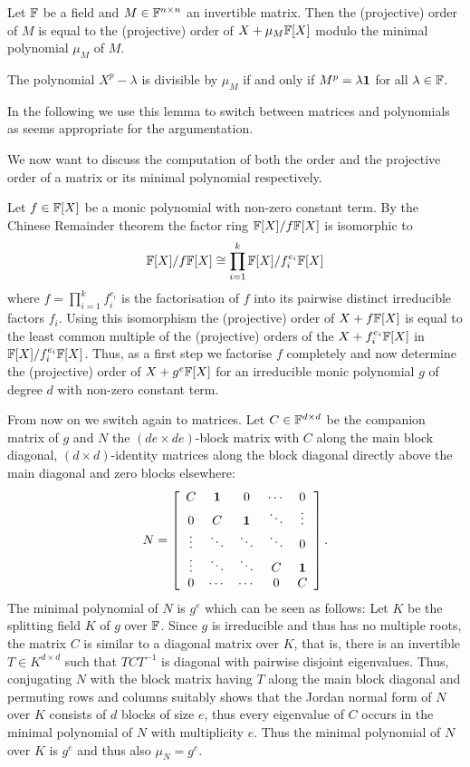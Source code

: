 \begin{Lemm}
Let $\mathbb{F}$ be a field and $M \in \mathbb{F}^{n \times n}$ an invertible matrix.
Then the (projective) order of $M$ is equal to the (projective) order of
$X + \mu_M \mathbb{F}[X]$ modulo the minimal polynomial $\mu_M$ of $M$.
\end{Lemm}
\proofbeg 
The polynomial $X^p-\lambda$ is divisible by $\mu_M$ if and
only if $M^p = \lambda \mathbf{1}$ for all $\lambda \in \mathbb{F}$.
\proofend

In the following we use this lemma to switch between matrices and
polynomials as seems appropriate for the argumentation.

We now want to discuss the computation of both the order and the
projective order of a matrix or its minimal polynomial respectively.

Let $f \in \mathbb{F}[X]$ be a monic polynomial with non-zero constant term. 
By the Chinese Remainder theorem the factor ring
$\mathbb{F}[X]/f\mathbb{F}[X]$ is isomorphic to
\[ \mathbb{F}[X]/f\mathbb{F}[X] \cong
   \prod_{i=1}^k \mathbb{F}[X]/f_i^{e_i} \mathbb{F}[X] \]
where $f = \prod_{i=1}^k f_i^{e_i}$ is the factorisation of $f$ into
its pairwise distinct irreducible factors $f_i$. Using this
isomorphism the (projective) order of $X+f\mathbb{F}[X]$ is equal to the least 
common multiple of the (projective) orders of the $X + f_i^{e_i}
\mathbb{F}[X]$ in $\mathbb{F}[X]/f_i^{e_i}\mathbb{F}[X]$. Thus, as a first step we factorise
$f$ completely and now determine the (projective) order of
$X+g^e\mathbb{F}[X]$ for an irreducible monic polynomial $g$ of degree $d$ 
with non-zero constant term.

From now on we switch again to matrices. Let $C \in \mathbb{F}^{d \times d}$ be 
the companion matrix of $g$ and $N$ the $(de \times de)$-block matrix with 
$C$ along the main block diagonal, $(d \times d)$-identity matrices
along the block diagonal directly above the main diagonal and zero blocks
elsewhere:
\[ N = \left[ \begin{array}{ccccc}
    C      & \mathbf{1}   & 0      & \cdots & 0 \\
    0      & C      & \mathbf{1}   & \ddots & \vdots \\
    \vdots & \ddots & \ddots & \ddots & 0 \\
    \vdots & \ddots & \ddots & C      & \mathbf{1} \\
    0      & \cdots & \cdots & 0      & C
\end{array} \right]. \]
The minimal polynomial of $N$ is $g^e$ which can be seen as follows:
Let $K$ be the splitting field $K$ of $g$ over $\mathbb{F}$. Since $g$ is
irreducible and thus has no multiple roots, the 
matrix $C$ is similar to a diagonal matrix over $K$, that is, there is an
invertible $T \in K^{d \times d}$ such that $TCT^{-1}$ is diagonal
with pairwise disjoint eigenvalues.
Thus, conjugating $N$ with the block matrix having $T$ along the
main block diagonal and permuting rows and columns suitably shows that
the Jordan normal form of $N$ over $K$ consists of $d$ blocks of
size $e$, thus every eigenvalue of $C$ occurs in the minimal
polynomial of $N$ with multiplicity $e$. Thus the minimal polynomial
of $N$ over $K$ is $g^e$ and thus also $\mu_N = g^e$.

